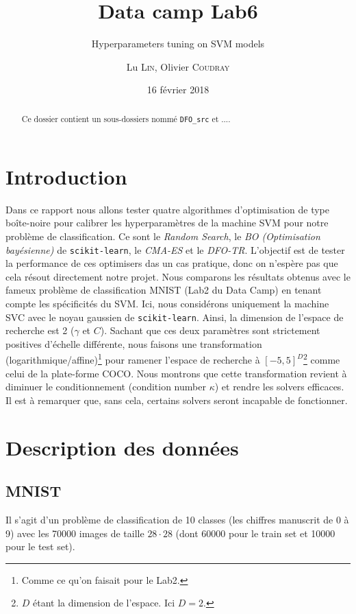 \documentclass[12 pt, a4paper]{article}
\title[Data camp 2018]{Data camp Lab6}
\subtitle{Hyperparameters tuning on SVM models}
\author{Lu \textsc{Lin}, Olivier \textsc{Coudray}}
\date{16 février 2018}
\begin{document}
\maketitle




\begin{abstract}
Ce dossier contient un sous-dossiers nommé \texttt{DFO\_src} et ....

\end{abstract}

\section{Introduction}
Dans ce rapport nous allons tester quatre algorithmes d'optimisation de type boîte-noire pour calibrer les hyperparamètres de la machine SVM pour notre problème de classification. Ce sont le \textit{Random Search}, le \textit{BO (Optimisation bayésienne)} de \texttt{scikit-learn}, le \textit{CMA-ES} et le \textit{DFO-TR}. L'objectif est de tester la performance de ces optimisers das un cas pratique, donc on n'espère pas que cela résout directement notre projet. Nous comparons les résultats obtenus avec le fameux problème de classification MNIST (Lab2 du Data Camp) en tenant compte les spécificités du SVM. Ici, nous considérons uniquement la machine SVC avec le noyau gaussien de \texttt{scikit-learn}. Ainsi, la dimension de l'espace de recherche est 2 ($\gamma$ et $C$). Sachant que ces deux paramètres sont strictement positives d'échelle différente, nous faisons une transformation (logarithmique/affine)\footnote{Comme ce qu'on faisait pour le Lab2.} pour ramener l'espace de recherche à $[-5, 5]^{D}$\footnote{$D$ étant la dimension de l'espace. Ici $D=2$.} comme celui de la plate-forme COCO. Nous montrons que cette transformation revient à diminuer le conditionnement (condition number $\kappa$) et rendre les solvers efficaces. Il est à remarquer que, sans cela, certains solvers seront incapable de fonctionner.


\section{Description des données}
\subsection{MNIST}
Il s'agit d'un problème de classification de 10 classes (les chiffres manuscrit de 0 à 9) avec les 70000 images de taille $28\cdot 28$ (dont 60000 pour le train set et 10000 pour le test set).
\end{document}
